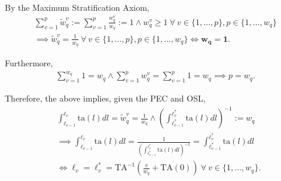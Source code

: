 \documentclass[hidelinks, nonatbib]{elsarticle}
\begin{document}
By the Maximum Stratification Axiom,
\begin{gather}
\sum_{v=1}^{p}{
    \tilde{w}_{q}^{v}
}
:=
\sum_{v=1}^{p}{
    \frac{
        w_{q}^{v}
    }{
        w_q
    }
}
:= 1
\land
w_{q}^{v} 
\geq 
1
\
\forall
\
v \in \{1, \dots, p\},
p \in \{1, \dots, w_q\}
\\
\implies
\tilde{w}_{q}^{v} =
\frac{1}{w_q}
\
\forall
\
v \in \{1, \dots, p\},
p \in \{1, \dots, w_q\}
\iff
\boldsymbol{w_q} =
\boldsymbol{1}
.
\end{gather}

Furthermore,
\begin{gather}
\sum_{v=1}^{w_q}
1
=
w_q
\land
\sum_{v=1}^{p}{
    w_{q}^{v}
}
=
\sum_{v=1}^{p}{
        1
}
= w_q
\implies
p = w_q
.
\end{gather}

Therefore, the above implies, given the PEC and OSL,
\begin{align}
&
\int_{\ell_{v-1}}^{\ell_{v}}{
    \text{ta}(l)
    dl
}
=
\tilde{w}_{q}^{v} =
\frac{1}{w_q}
\land
\left(
    \int_{
        \ell_{v-1}^{*}
    }^{
        \ell_{v}^{*}    
    }{
        \text{ta}(l)
        dl
    }
\right) ^ {-1}
:=
w_q
\\
&
\implies
\int_{\ell_{v-1}}^{\ell_{v}}{
    \text{ta}(l)
    dl
}
=
\frac{1}{
    \left(
        \int_{
            \ell_{v-1}^{*}
        }^{
            \ell_{v}^{*}    
        }{
            \text{ta}(l)
            dl
        }
    \right) ^ {-1}
}
=
\int_{
    \ell_{v-1}^{*}
}^{
    \ell_{v}^{*}    
}{
    \text{ta}(l)
    dl
}
\\
&
\iff
\ell_{v}
=
\ell_{v}^{*}
=
\text{TA}^{-1}\left(
    \frac{v}{w_q}
    +
    \text{TA}(0)
\right)
\
\forall
\
v \in \{1, \dots, w_q\}
.
\end{align}
\end{document}
